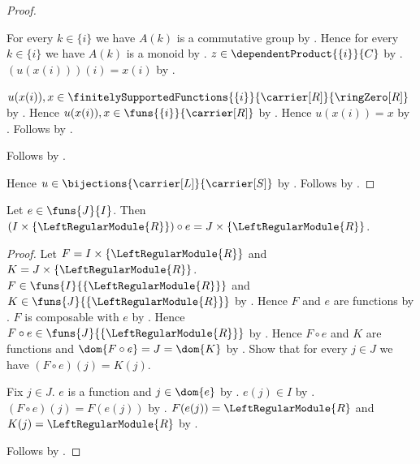 \begin{proof}
\begin{subproof}
\begin{subproof}
\begin{subproof}
                For every $k\in\{i\}$ we have $A(k)$ is a commutative group by
                    .
                Hence for every $k\in\{i\}$ we have $A(k)$ is a monoid by
                    .
                $z\in\dependentProduct{\{i\}}{C}$ by
                    .
                $(u(x(i)))(i)=x(i)$ by
                    .
            \end{subproof}
            $u(x(i)),x\in\finitelySupportedFunctions{\{i\}}{
                \carrier[R]}{\ringZero[R]}$ by
                .
            Hence $u(x(i)),x\in\funs{\{i\}}{\carrier[R]}$ by
                .
            Hence $u(x(i))=x$ by
                .
            Follows by \auto.
        \end{subproof}
        Follows by .
    \end{subproof}
    Hence $u\in\bijections{\carrier[L]}{\carrier[S]}$ by
        .
    Follows by .
\end{proof}

\begin{proposition}\label{free_module_regular_family_reindex}
    Let $e\in\funs{J}{I}$.
    Then
        $(I\times\{\LeftRegularModule{R}\})\circ e
            =J\times\{\LeftRegularModule{R}\}$.
\end{proposition}
\begin{proof}
    Let $F=I\times\{\LeftRegularModule{R}\}$ and
        $K=J\times\{\LeftRegularModule{R}\}$.
    $F\in\funs{I}{\{\LeftRegularModule{R}\}}$ and
        $K\in\funs{J}{\{\LeftRegularModule{R}\}}$ by
        .
    Hence $F$ and $e$ are functions by
        .
    $F$ is composable with $e$ by .
    Hence $F\circ e\in\funs{J}{\{\LeftRegularModule{R}\}}$ by
        .
    Hence $F\circ e$ and $K$ are functions and
        $\dom{F\circ e}=J=\dom{K}$ by
        .
    Show that for every $j\in J$ we have $(F\circ e)(j)=K(j)$.
    \begin{subproof}
        Fix $j\in J$.
        $e$ is a function and $j\in\dom{e}$ by
            .
        $e(j)\in I$ by .
        $(F\circ e)(j)=F(e(j))$ by .
        $F(e(j))=\LeftRegularModule{R}$ and
            $K(j)=\LeftRegularModule{R}$ by
            .
    \end{subproof}
    Follows by .
\end{proof}

